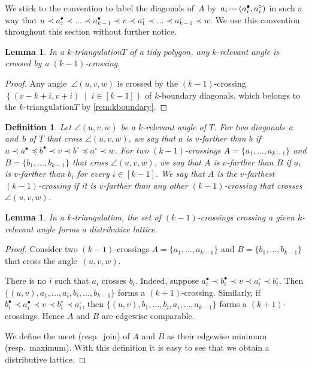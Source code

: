 \documentclass{amsart}
\newtheorem{lemma}[theorem]{Lemma}
\newtheorem{definition}[theorem]{Definition}
\theoremstyle{remark}
\newcommand{\darkblue}{\color{darkblue}} %
\newcommand{\defn}[1]{\textsl{\darkblue #1}} %
\newcommand{\set}[2]{\left\{ #1 \;\middle|\; #2 \right\}} %
\newcommand{\eqdef}{\mbox{\,\raisebox{0.2ex}{\scriptsize\ensuremath{\mathrm:}}\ensuremath{=}\,}} %
\newcommand*{\ktg}[0]{$k$-triangulation\xspace}
\newcommand{\cl}{\prec}
\newcommand{\cle}{\preccurlyeq}
\begin{document}
We stick to the convention to label the diagonals of~$A$ by~$a_i \eqdef (a^\bullet_i, a^\circ_i)$ in such a way that $u \cl a^\bullet_1 \cl \dots \cl a^\bullet_{k-1} \cl v \cl a^\circ_1 \cl \dots \cl a^\circ_{k-1} \cl w$. We use this convention throughout this section without further notice.

\begin{lemma}
\label{lem:tidyExists}
In a \ktg $T$ of a tidy polygon, any $k$-relevant angle is crossed by a $(k-1)$-crossing.
\end{lemma}

\begin{proof}
Any angle~$\angle(u,v,w)$ is crossed by the $(k-1)$-crossing~$\set{(v-k+i, v+i)}{i \in [k-1]}$ of $k$-boundary diagonals, which belongs to the \ktg $T$ by \cref{rem:kboundary}.
\end{proof}

\begin{definition}
Let $\angle(u,v,w)$ be a $k$-relevant angle of $T$.
For two diagonals~$a$ and~$b$ of $T$ that cross $\angle(u,v,w)$, we say that $a$ is \defn{$v$-farther} than $b$ if $u \cl a^\bullet \cle b^\bullet \cl v \cl b^\circ \cle a^\circ \cl w$. For two $(k-1)$-crossings $A = \{a_1, \dots, a_{k-1}\}$ and $B = \{b_1, \dots, b_{k-1}\}$ that cross $\angle(u,v,w)$, we say that $A$ is \defn{$v$-farther} than $B$ if $a_i$ is $v$-farther than $b_i$ for every $i \in [k-1]$. We say that $A$ is the \defn{$v$-farthest} $(k-1)$-crossing if it is $v$-farther than any other $(k-1)$-crossing that crosses~$\angle(u,v,w)$.
\end{definition}

\begin{lemma}
In a \ktg, the set of $(k-1)$-crossings crossing a given $k$-relevant angle forms a distributive lattice.
\end{lemma}

\begin{proof}
Consider two $(k-1)$-crossings $A = \{a_1, \dots, a_{k-1}\}$ and $B = \{b_1, \dots, b_{k-1}\}$ that cross the angle~$(u,v,w)$.

There is no $i$ such that $a_i$ crosses $b_i$. 
Indeed, suppose $a^\bullet_i \cl b^\bullet_i \cl v \cl a^\circ_i \cl b^\circ_i$. Then $\{(u, v), a_1, \dots, a_i, b_i, \dots, b_{k-1}\}$ forms a $(k+1)$-crossing. 
Similarly, if $b^\bullet_i \cl a^\bullet_i \cl v \cl b^\circ_i \cl a^\circ_i$, then $\{(u, v), b_1, \dots, b_i, a_i, \dots, a_{k-1}\}$ forms a $(k+1)$-crossings.
Hence $A$ and $B$ are edgewise comparable.

We define the meet (resp.~join) of $A$ and $B$ as their edgewise minimum (resp.~maximum). With this definition it is easy to see that we obtain a distributive lattice.
\end{proof}
\end{document}
